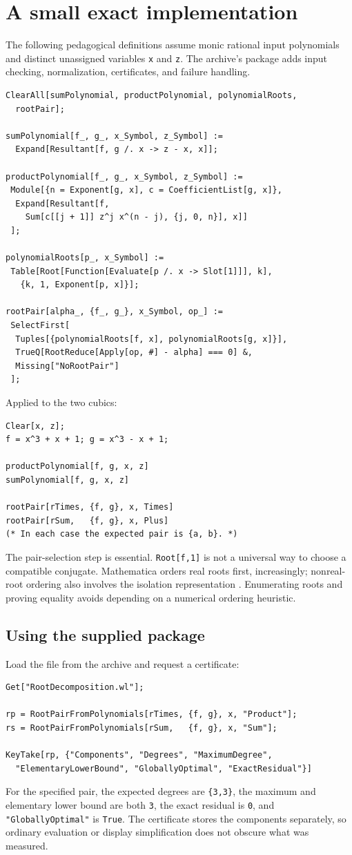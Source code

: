 \documentclass[11pt,a4paper]{article}
\newcommand{\code}[1]{\texttt{#1}}
\theoremstyle{definition}
\theoremstyle{remark}
\begin{document}
\section{A small exact implementation}
\label{sec:smallcode}
The following pedagogical definitions assume monic rational input polynomials and distinct unassigned variables \code{x} and \code{z}. The archive's package adds input checking, normalization, certificates, and failure handling.
\begin{lstlisting}
ClearAll[sumPolynomial, productPolynomial, polynomialRoots,
  rootPair];

sumPolynomial[f_, g_, x_Symbol, z_Symbol] :=
  Expand[Resultant[f, g /. x -> z - x, x]];

productPolynomial[f_, g_, x_Symbol, z_Symbol] :=
 Module[{n = Exponent[g, x], c = CoefficientList[g, x]},
  Expand[Resultant[f,
    Sum[c[[j + 1]] z^j x^(n - j), {j, 0, n}], x]]
 ];

polynomialRoots[p_, x_Symbol] :=
 Table[Root[Function[Evaluate[p /. x -> Slot[1]]], k],
   {k, 1, Exponent[p, x]}];

rootPair[alpha_, {f_, g_}, x_Symbol, op_] :=
 SelectFirst[
  Tuples[{polynomialRoots[f, x], polynomialRoots[g, x]}],
  TrueQ[RootReduce[Apply[op, #] - alpha] === 0] &,
  Missing["NoRootPair"]
 ];
\end{lstlisting}
Applied to the two cubics:
\begin{lstlisting}
Clear[x, z];
f = x^3 + x + 1; g = x^3 - x + 1;

productPolynomial[f, g, x, z]
sumPolynomial[f, g, x, z]

rootPair[rTimes, {f, g}, x, Times]
rootPair[rSum,   {f, g}, x, Plus]
(* In each case the expected pair is {a, b}. *)
\end{lstlisting}
The pair-selection step is essential. \code{Root[f,1]} is not a universal way to choose a compatible conjugate. Mathematica orders real roots first, increasingly; nonreal-root ordering also involves the isolation representation \cite{root}. Enumerating roots and proving equality avoids depending on a numerical ordering heuristic.

\subsection{Using the supplied package}
Load the file from the archive and request a certificate:
\begin{lstlisting}
Get["RootDecomposition.wl"];

rp = RootPairFromPolynomials[rTimes, {f, g}, x, "Product"];
rs = RootPairFromPolynomials[rSum,   {f, g}, x, "Sum"];

KeyTake[rp, {"Components", "Degrees", "MaximumDegree",
  "ElementaryLowerBound", "GloballyOptimal", "ExactResidual"}]
\end{lstlisting}
For the specified pair, the expected degrees are \code{\{3,3\}}, the maximum and elementary lower bound are both \code{3}, the exact residual is \code{0}, and \code{"GloballyOptimal"} is \code{True}. The certificate stores the components separately, so ordinary evaluation or display simplification does not obscure what was measured.
\end{document}
